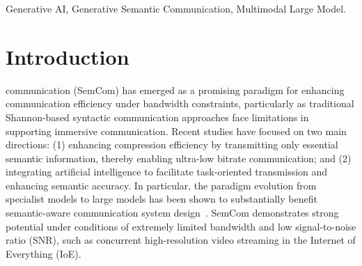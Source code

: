 \documentclass[10pt,journal]{IEEEtran}
\begin{document}
\maketitle
\begin{abstract}
Driven by the massive video transmission requirements in the Internet of Everything, semantic communication holds great promise for striking a balance between transmission efficiency and quality.
This paper introduces a large-model-driven generative video semantic communication (LGVSC) framework, enabling efficient video semantic transmission under extremely low bandwidth conditions. 
First, by decoupling the encoder and decoder as well as exposing explicit intermediate semantic representations, LGVSC maintains interpretability, avoiding the black-box behavior commonly observed in end-to-end systems.
Next, we introduce a new metric, i.e., the probability-based semantic similarity score (PSSS), which quantifies semantic similarity for complex modalities within a continuous range, allowing for more precise evaluation of semantic content.
Building on PSSS, we propose a semantic-guided keyframe extraction module driven by a multimodal large model. This module can enhance fine-grained semantic consistency during keyframe selection at the transmitter, optimizing transmission bandwidth without compromising semantic fidelity.
Additionally, we design a generative large-model-driven dynamic semantic-adaptive decoder at the receiver, which can adapt to videos of arbitrary lengths.
Simulation results demonstrate that LGVSC significantly outperforms traditional schemes, {achieving a channel bandwidth ratio on the order of $\bm{10^{-4}}$ to $\bm{10^{-3}}$,} while maintaining strong zero-shot generalization across downstream tasks.
\end{abstract}
\begin{IEEEkeywords}
Generative AI, Generative Semantic Communication, Multimodal Large Model.
\end{IEEEkeywords}

\IEEEpeerreviewmaketitle

\section{Introduction}

 {communication} (SemCom) has emerged as a promising paradigm for enhancing communication efficiency under bandwidth constraints, particularly as traditional Shannon-based syntactic communication approaches face limitations in supporting immersive communication. Recent studies have focused on two main directions: (1) enhancing compression efficiency by transmitting only essential semantic information, thereby enabling ultra-low bitrate communication; and (2) integrating artificial intelligence to facilitate task-oriented transmission and enhancing semantic accuracy. In particular, the paradigm evolution from specialist models to large models has been shown to substantially benefit semantic-aware communication system design~\cite{ying2026specialist}. SemCom demonstrates strong potential under conditions of extremely limited bandwidth and low signal-to-noise ratio (SNR), such as concurrent high-resolution video streaming in the Internet of Everything (IoE).
\end{document}

